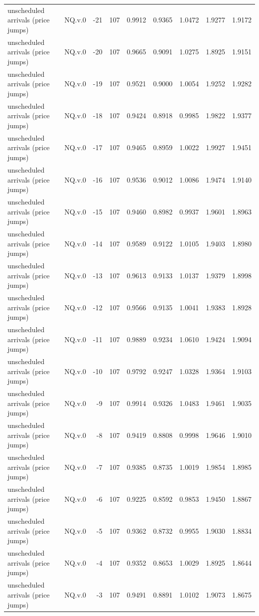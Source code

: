 \begin{tabular}{llrrrrrrr}
unscheduled arrivals (price jumps) & NQ.v.0 & -21 & 107 & 0.9912 & 0.9365 & 1.0472 & 1.9277 & 1.9172 \\
unscheduled arrivals (price jumps) & NQ.v.0 & -20 & 107 & 0.9665 & 0.9091 & 1.0275 & 1.8925 & 1.9151 \\
unscheduled arrivals (price jumps) & NQ.v.0 & -19 & 107 & 0.9521 & 0.9000 & 1.0054 & 1.9252 & 1.9282 \\
unscheduled arrivals (price jumps) & NQ.v.0 & -18 & 107 & 0.9424 & 0.8918 & 0.9985 & 1.9822 & 1.9377 \\
unscheduled arrivals (price jumps) & NQ.v.0 & -17 & 107 & 0.9465 & 0.8959 & 1.0022 & 1.9927 & 1.9451 \\
unscheduled arrivals (price jumps) & NQ.v.0 & -16 & 107 & 0.9536 & 0.9012 & 1.0086 & 1.9474 & 1.9140 \\
unscheduled arrivals (price jumps) & NQ.v.0 & -15 & 107 & 0.9460 & 0.8982 & 0.9937 & 1.9601 & 1.8963 \\
unscheduled arrivals (price jumps) & NQ.v.0 & -14 & 107 & 0.9589 & 0.9122 & 1.0105 & 1.9403 & 1.8980 \\
unscheduled arrivals (price jumps) & NQ.v.0 & -13 & 107 & 0.9613 & 0.9133 & 1.0137 & 1.9379 & 1.8998 \\
unscheduled arrivals (price jumps) & NQ.v.0 & -12 & 107 & 0.9566 & 0.9135 & 1.0041 & 1.9383 & 1.8928 \\
unscheduled arrivals (price jumps) & NQ.v.0 & -11 & 107 & 0.9889 & 0.9234 & 1.0610 & 1.9424 & 1.9094 \\
unscheduled arrivals (price jumps) & NQ.v.0 & -10 & 107 & 0.9792 & 0.9247 & 1.0328 & 1.9364 & 1.9103 \\
unscheduled arrivals (price jumps) & NQ.v.0 & -9 & 107 & 0.9914 & 0.9326 & 1.0483 & 1.9461 & 1.9035 \\
unscheduled arrivals (price jumps) & NQ.v.0 & -8 & 107 & 0.9419 & 0.8808 & 0.9998 & 1.9646 & 1.9010 \\
unscheduled arrivals (price jumps) & NQ.v.0 & -7 & 107 & 0.9385 & 0.8735 & 1.0019 & 1.9854 & 1.8985 \\
unscheduled arrivals (price jumps) & NQ.v.0 & -6 & 107 & 0.9225 & 0.8592 & 0.9853 & 1.9450 & 1.8867 \\
unscheduled arrivals (price jumps) & NQ.v.0 & -5 & 107 & 0.9362 & 0.8732 & 0.9955 & 1.9030 & 1.8834 \\
unscheduled arrivals (price jumps) & NQ.v.0 & -4 & 107 & 0.9352 & 0.8653 & 1.0029 & 1.8925 & 1.8644 \\
unscheduled arrivals (price jumps) & NQ.v.0 & -3 & 107 & 0.9491 & 0.8891 & 1.0102 & 1.9073 & 1.8675 \\

\end{tabular}

